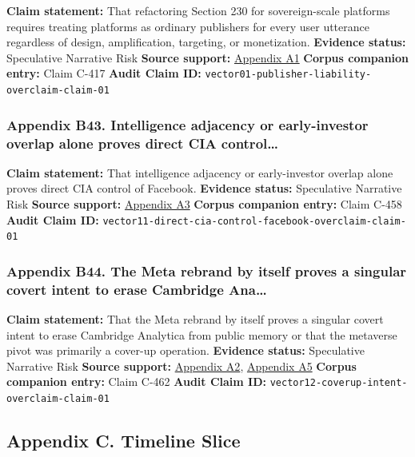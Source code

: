 \documentclass[
  american,
  11pt,
  letterpaper,
]{article}
\begin{document}
\textbf{Claim statement:} That refactoring Section 230 for
sovereign-scale platforms requires treating platforms as ordinary
publishers for every user utterance regardless of design, amplification,
targeting, or monetization. \textbf{Evidence status:} Speculative
Narrative Risk \textbf{Source support:}
\hyperref[ch-01-appendix-a1-a-look-behind-the-screens-examining-the-data-practices-of-social-media-and-video-streaming-services]{Appendix
A1} \textbf{Corpus companion entry:} Claim C-417 \textbf{Audit Claim
ID:} \texttt{vector01-publisher-liability-overclaim-claim-01}

\subsubsection{Appendix B43. Intelligence adjacency or early-investor
overlap alone proves direct CIA
control\ldots{}}\label{ch-01-appendix-b43-intelligence-adjacency-or-early-investor-overlap-alone-proves-direct-cia-control}

\textbf{Claim statement:} That intelligence adjacency or early-investor
overlap alone proves direct CIA control of Facebook. \textbf{Evidence
status:} Speculative Narrative Risk \textbf{Source support:}
\hyperref[ch-01-appendix-a3-facebook-inc-registration-statement-on-form-s-1]{Appendix
A3} \textbf{Corpus companion entry:} Claim C-458 \textbf{Audit Claim
ID:} \texttt{vector11-direct-cia-control-facebook-overclaim-claim-01}

\subsubsection{Appendix B44. The Meta rebrand by itself proves a
singular covert intent to erase Cambridge
Ana\ldots{}}\label{ch-01-appendix-b44-the-meta-rebrand-by-itself-proves-a-singular-covert-intent-to-erase-cambridge-ana}

\textbf{Claim statement:} That the Meta rebrand by itself proves a
singular covert intent to erase Cambridge Analytica from public memory
or that the metaverse pivot was primarily a cover-up operation.
\textbf{Evidence status:} Speculative Narrative Risk \textbf{Source
support:}
\hyperref[ch-01-appendix-a2-ftc-imposes-5-billion-penalty-and-sweeping-new-privacy-restrictions-on-facebook]{Appendix
A2},
\hyperref[ch-01-appendix-a5-the-facebook-company-is-now-meta]{Appendix
A5} \textbf{Corpus companion entry:} Claim C-462 \textbf{Audit Claim
ID:} \texttt{vector12-coverup-intent-overclaim-claim-01}

\subsection{Appendix C. Timeline
Slice}\label{appendix-c.-timeline-slice-1}
\end{document}
